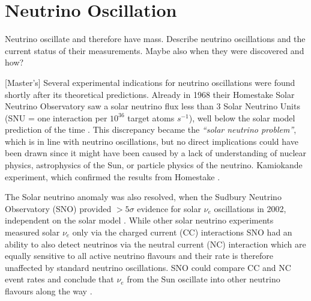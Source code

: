 
\section{Neutrino Oscillation}
Neutrino oscillate and therefore have mass. Describe neutrino oscillations and the current status of their measurements. Maybe also when they were discovered and how?



[Master's] Several experimental indications for neutrino oscillations were found shortly after its theoretical predictions. Already in 1968 their Homestake Solar Neutrino Observatory saw a solar neutrino flux less than 3 Solar Neutrino Units (SNU = one interaction per $10^{36}$ target atoms $\unit{s^{-1}}$), well below the solar model prediction of the time \cite{Homestake1968.pdf}. This discrepancy became the \textit{“solar neutrino problem”}, which is in line with neutrino oscillations, but no direct implications could have been drawn since it might have been caused by a lack of understanding of nuclear physics, astrophysics of the Sun, or particle physics of the neutrino\cite{GoodmanAdvancesInNeutrinoPhysics.pdf}. Kamiokande experiment, which confirmed the results from Homestake \cite{Kamiokande96.pdf}.

The Solar neutrino anomaly was also resolved, when the Sudbury Neutrino Observatory (SNO) provided $>5\sigma$ evidence for  solar $\nu_e$ oscillations in 2002, independent on the solar model \cite{NCOscInSNOSecondOscResult.pdf}. While other solar neutrino experiments measured solar $\nu_e$ only via the charged current (CC) interactions SNO had an ability to also detect neutrinos via the neutral current (NC) interaction which are equally sensitive to all active neutrino flavours and their rate is therefore unaffected by standard neutrino oscillations. SNO could compare CC and NC event rates and conclude that $\nu_e$ from the Sun oscillate into other neutrino flavours along the way \cite{NCOscInSNOSecondOscResult.pdf}.

